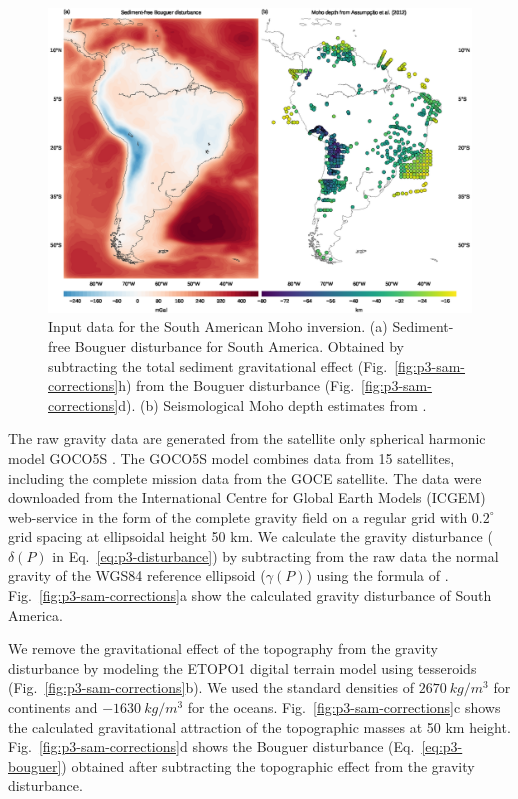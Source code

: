 \begin{figure}
    \centering
    \includegraphics[width=\textwidth]{figures/paper-moho/south-america-data}
    \caption{
        Input data for the South American Moho inversion.
        (a) Sediment-free Bouguer disturbance for South America.
        Obtained by subtracting the total sediment gravitational effect
        (Fig.~\ref{fig:p3-sam-corrections}h) from the Bouguer disturbance
        (Fig.~\ref{fig:p3-sam-corrections}d).
        (b) Seismological Moho depth estimates from
        \citet{assumpcao2013a}.
    }
    \label{fig:p3-sam-data}
\end{figure}


The raw gravity data are generated from the satellite only
spherical harmonic model GOCO5S \citet{mayer-guerr2015}.
The GOCO5S model combines data from 15 satellites, including the complete
mission data from the GOCE satellite.
The data were downloaded from the
International Centre for Global Earth Models (ICGEM) web-service
\citep[][ \url{http://icgem.gfz-potsdam.de/ICGEM/})]{barthelmes2012}
in the form of the complete gravity field
on a regular grid with $0.2^\circ$ grid spacing at ellipsoidal height 50 km.
We calculate the gravity disturbance
($\delta(P)$ in Eq.~\ref{eq:p3-disturbance})
by subtracting from the raw data
the normal gravity of the WGS84 reference ellipsoid ($\gamma(P)$)
using the formula of \citet{li2001a}.
Fig.~\ref{fig:p3-sam-corrections}a show the calculated gravity disturbance of
South America.

We remove the gravitational effect of the topography
from the gravity disturbance
by modeling the ETOPO1 digital terrain model
\citep[][ \url{http://dx.doi.org/10.7289/V5C8276M}]{amante2009}
using tesseroids (Fig.~\ref{fig:p3-sam-corrections}b).
We used the standard densities of $2670\ kg/m^3$ for continents and
$-1630\ kg/m^3$ for the oceans.
Fig.~\ref{fig:p3-sam-corrections}c shows the calculated gravitational attraction
of the topographic masses at 50 km height.
Fig.~\ref{fig:p3-sam-corrections}d shows the Bouguer disturbance
(Eq.~\ref{eq:p3-bouguer}) obtained after subtracting the topographic effect from
the gravity disturbance.

